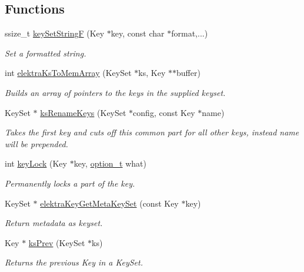\subsection*{Functions}
\begin{DoxyCompactItemize}
\item 
ssize\+\_\+t \hyperlink{group__api_ga812eb6c4f506dafa5733bf531c52199c}{key\+Set\+String\+F} (Key $\ast$key, const char $\ast$format,...)
\begin{DoxyCompactList}\small\item\em Set a formatted string. \end{DoxyCompactList}\item 
int \hyperlink{group__api_gac3e995819383f904369c260f212125f5}{elektra\+Ks\+To\+Mem\+Array} (Key\+Set $\ast$ks, Key $\ast$$\ast$buffer)
\begin{DoxyCompactList}\small\item\em Builds an array of pointers to the keys in the supplied keyset. \end{DoxyCompactList}\item 
Key\+Set $\ast$ \hyperlink{group__api_ga7557d07db07649b9d81e6da63ce59376}{ks\+Rename\+Keys} (Key\+Set $\ast$config, const Key $\ast$name)
\begin{DoxyCompactList}\small\item\em Takes the first key and cuts off this common part for all other keys, instead name will be prepended. \end{DoxyCompactList}\item 
int \hyperlink{group__api_ga2dd8d2650e59a90e933c631267bfbb85}{key\+Lock} (Key $\ast$key, \hyperlink{group__keyset_ga98a3d6a4016c9dad9cbd1a99a9c2a45a}{option\+\_\+t} what)
\begin{DoxyCompactList}\small\item\em Permanently locks a part of the key. \end{DoxyCompactList}\item 
Key\+Set $\ast$ \hyperlink{group__api_ga48120f254e09e0c5cceff4864f110ceb}{elektra\+Key\+Get\+Meta\+Key\+Set} (const Key $\ast$key)
\begin{DoxyCompactList}\small\item\em Return metadata as keyset. \end{DoxyCompactList}\item 
Key $\ast$ \hyperlink{group__api_gae7d268f13dd89a6e126b3718b117996f}{ks\+Prev} (Key\+Set $\ast$ks)
\begin{DoxyCompactList}\small\item\em Returns the previous Key in a Key\+Set. \end{DoxyCompactList}\item 
$$
\end{DoxyCompactItemize}
